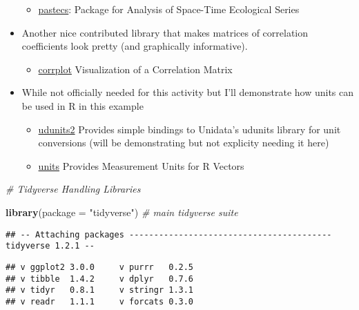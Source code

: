 \documentclass[]{article}
\newenvironment{Shaded}{\begin{snugshade}}{\end{snugshade}}
\newcommand{\CommentTok}[1]{\textcolor[rgb]{0.56,0.35,0.01}{\textit{#1}}}
\newcommand{\DataTypeTok}[1]{\textcolor[rgb]{0.13,0.29,0.53}{#1}}
\newcommand{\KeywordTok}[1]{\textcolor[rgb]{0.13,0.29,0.53}{\textbf{#1}}}
\newcommand{\NormalTok}[1]{#1}
\newcommand{\StringTok}[1]{\textcolor[rgb]{0.31,0.60,0.02}{#1}}
\providecommand{\tightlist}{%
  \setlength{\itemsep}{0pt}\setlength{\parskip}{0pt}}
\begin{document}
\begin{itemize}
  \begin{itemize}
  \tightlist
  \item
    \href{https://www.rdocumentation.org/packages/pastecs/versions/1.3.21}{pastecs}:
    Package for Analysis of Space-Time Ecological Series
  \end{itemize}
\item
  Another nice contributed library that makes matrices of correlation
  coefficients look pretty (and graphically informative).

  \begin{itemize}
  \tightlist
  \item
    \href{https://www.rdocumentation.org/packages/corrplot/versions/0.84}{corrplot}
    Visualization of a Correlation Matrix
  \end{itemize}
\item
  While not officially needed for this activity but I'll demonstrate how
  units can be used in R in this example

  \begin{itemize}
  \tightlist
  \item
    \href{https://www.rdocumentation.org/packages/udunits2/versions/0.13}{udunits2}
    Provides simple bindings to Unidata's udunits library for unit
    conversions (will be demonstrating but not explicity needing it
    here)
  \item
    \href{https://www.rdocumentation.org/packages/units/versions/0.6-0}{units}
    Provides Measurement Units for R Vectors
  \end{itemize}
\end{itemize}

\begin{Shaded}
\begin{Highlighting}[]
  \CommentTok{# Tidyverse Handling Libraries}

  \KeywordTok{library}\NormalTok{(}\DataTypeTok{package =} \StringTok{"tidyverse"}\NormalTok{)  }\CommentTok{# main tidyverse suite}
\end{Highlighting}
\end{Shaded}

\begin{verbatim}
## -- Attaching packages ----------------------------------------- tidyverse 1.2.1 --
\end{verbatim}

\begin{verbatim}
## v ggplot2 3.0.0     v purrr   0.2.5
## v tibble  1.4.2     v dplyr   0.7.6
## v tidyr   0.8.1     v stringr 1.3.1
## v readr   1.1.1     v forcats 0.3.0
\end{verbatim}
\end{document}
